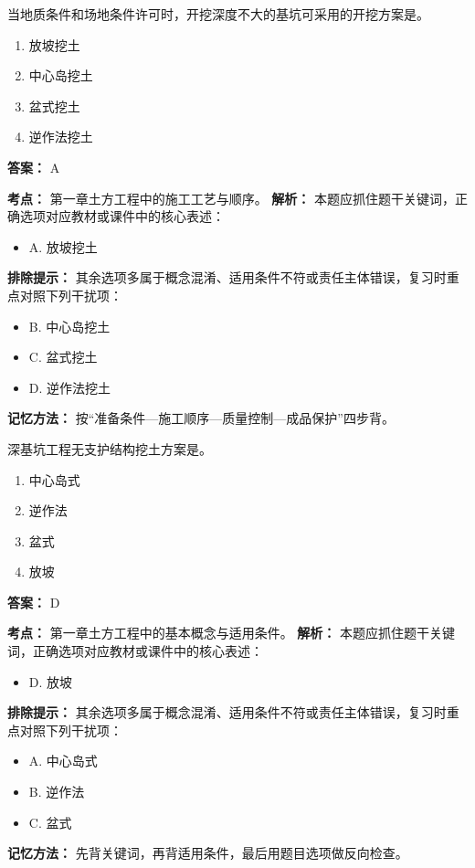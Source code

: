 \documentclass[UTF8,fontset=fandol,11pt]{ctexart}
\begin{document}
\begin{quizbox}[title={第 10 题}]
当地质条件和场地条件许可时，开挖深度不大的基坑可采用的开挖方案是。\\
\begin{enumerate}[label=\Alph*.]
\item 放坡挖土
\item 中心岛挖土
\item 盆式挖土
\item 逆作法挖土
\end{enumerate}
\textbf{答案：} A
\vspace{0.25em}
\begin{answerbox}[title={考点解析}]
\textbf{考点：} 第一章土方工程中的施工工艺与顺序。
\textbf{解析：} 本题应抓住题干关键词，正确选项对应教材或课件中的核心表述：
\begin{itemize}
\item A. 放坡挖土
\end{itemize}
\textbf{排除提示：} 其余选项多属于概念混淆、适用条件不符或责任主体错误，复习时重点对照下列干扰项：
\begin{itemize}
\item B. 中心岛挖土
\item C. 盆式挖土
\item D. 逆作法挖土
\end{itemize}
\textbf{记忆方法：} 按“准备条件—施工顺序—质量控制—成品保护”四步背。
\end{answerbox}
\end{quizbox}

\vspace{0.2em}

\begin{quizbox}[title={第 11 题}]
深基坑工程无支护结构挖土方案是。\\
\begin{enumerate}[label=\Alph*.]
\item 中心岛式
\item 逆作法
\item 盆式
\item 放坡
\end{enumerate}
\textbf{答案：} D
\vspace{0.25em}
\begin{answerbox}[title={考点解析}]
\textbf{考点：} 第一章土方工程中的基本概念与适用条件。
\textbf{解析：} 本题应抓住题干关键词，正确选项对应教材或课件中的核心表述：
\begin{itemize}
\item D. 放坡
\end{itemize}
\textbf{排除提示：} 其余选项多属于概念混淆、适用条件不符或责任主体错误，复习时重点对照下列干扰项：
\begin{itemize}
\item A. 中心岛式
\item B. 逆作法
\item C. 盆式
\end{itemize}
\textbf{记忆方法：} 先背关键词，再背适用条件，最后用题目选项做反向检查。
\end{answerbox}
\end{quizbox}
\end{document}
